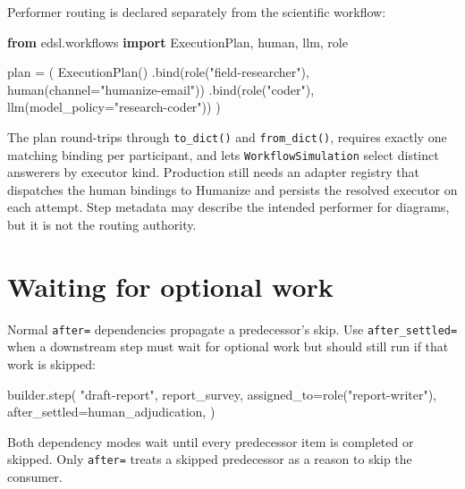\documentclass[
  10pt,
]{report}
\newenvironment{Shaded}{}{}
\newcommand{\ImportTok}[1]{\textcolor[rgb]{0.00,0.50,0.00}{\textbf{#1}}}
\newcommand{\NormalTok}[1]{#1}
\newcommand{\OperatorTok}[1]{\textcolor[rgb]{0.40,0.40,0.40}{#1}}
\newcommand{\StringTok}[1]{\textcolor[rgb]{0.25,0.44,0.63}{#1}}
\begin{document}
Performer routing is declared separately from the scientific workflow:

\begin{Shaded}
\begin{Highlighting}[]
\ImportTok{from}\NormalTok{ edsl.workflows }\ImportTok{import}\NormalTok{ ExecutionPlan, human, llm, role}

\NormalTok{plan }\OperatorTok{=}\NormalTok{ (}
\NormalTok{    ExecutionPlan()}
\NormalTok{    .bind(role(}\StringTok{"field{-}researcher"}\NormalTok{), human(channel}\OperatorTok{=}\StringTok{"humanize{-}email"}\NormalTok{))}
\NormalTok{    .bind(role(}\StringTok{"coder"}\NormalTok{), llm(model\_policy}\OperatorTok{=}\StringTok{"research{-}coder"}\NormalTok{))}
\NormalTok{)}
\end{Highlighting}
\end{Shaded}

The plan round-trips through \texttt{to\_dict()} and
\texttt{from\_dict()}, requires exactly one matching binding per
participant, and lets \texttt{WorkflowSimulation} select distinct
answerers by executor kind. Production still needs an adapter registry
that dispatches the human bindings to Humanize and persists the resolved
executor on each attempt. Step metadata may describe the intended
performer for diagrams, but it is not the routing authority.

\section{Waiting for optional work}\label{waiting-for-optional-work}

Normal \texttt{after=} dependencies propagate a predecessor's skip. Use
\texttt{after\_settled=} when a downstream step must wait for optional
work but should still run if that work is skipped:

\begin{Shaded}
\begin{Highlighting}[]
\NormalTok{builder.step(}
    \StringTok{"draft{-}report"}\NormalTok{,}
\NormalTok{    report\_survey,}
\NormalTok{    assigned\_to}\OperatorTok{=}\NormalTok{role(}\StringTok{"report{-}writer"}\NormalTok{),}
\NormalTok{    after\_settled}\OperatorTok{=}\NormalTok{human\_adjudication,}
\NormalTok{)}
\end{Highlighting}
\end{Shaded}

Both dependency modes wait until every predecessor item is completed or
skipped. Only \texttt{after=} treats a skipped predecessor as a reason
to skip the consumer.
\end{document}
